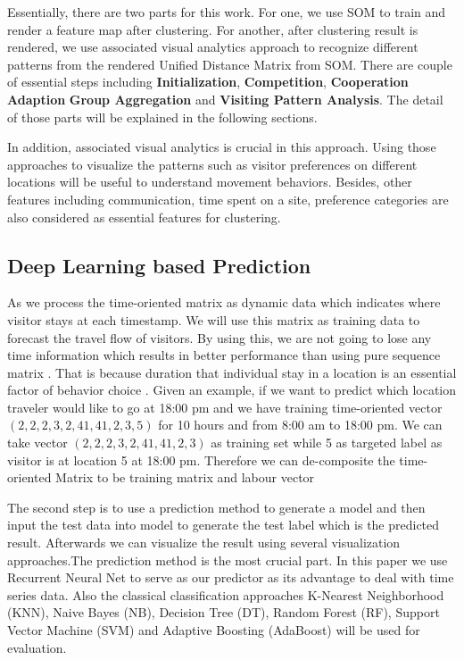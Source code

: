 \documentclass[runningheads,a4paper]{llncs}
\begin{document}
Essentially, there are two parts for this work. For one, we use SOM to train and render a feature map after clustering. For another, after clustering result is rendered, we use associated visual analytics approach to recognize different patterns from the rendered Unified Distance Matrix from SOM. There are couple of essential steps including \textbf{Initialization}, \textbf{Competition}, \textbf{Cooperation} \textbf{Adaption} \textbf{Group Aggregation} and \textbf{Visiting Pattern Analysis}. The detail of those parts will be explained in the following sections.

In addition, associated visual analytics is crucial in this approach. Using those approaches to visualize the patterns such as visitor preferences on different locations will be useful to understand movement behaviors. Besides, other features including communication, time spent on a site, preference categories are also considered as essential features for clustering.

\subsection{Deep Learning based Prediction}
As we process the time-oriented matrix as dynamic data which indicates where visitor stays at each timestamp. We will use this matrix as training data to forecast the travel flow of visitors. By using this, we are not going to lose any time information which results in better performance than using pure sequence matrix \cite{liu2016predicting}. That is because duration that individual stay in a location is an essential factor of behavior choice  \cite{zhang2016deep}.
Given an example, if we want to predict which location traveler would like to go at 18:00 pm and we have training time-oriented vector $ (2, 2, 2, 3, 2, 41, 41, 2, 3, 5)$ for 10 hours and from 8:00 am to 18:00 pm. We can take vector $ (2, 2, 2, 3, 2, 41, 41, 2, 3)$ as training set while 5 as targeted label as visitor is at location 5 at 18:00 pm. Therefore we can de-composite the time-oriented Matrix to be training matrix and labour vector

The second step is to use a prediction method to generate a model and then input the test data into model to generate the test label which is the predicted result. Afterwards we can visualize the result using several visualization approaches.The prediction method is the most crucial part. In this paper we use Recurrent Neural Net  \cite{lecun2015deep} to serve as our predictor as its advantage to deal with time series data. Also the classical classification approaches K-Nearest Neighborhood (KNN), Naive Bayes (NB), Decision Tree (DT), Random Forest (RF), Support Vector Machine (SVM) and Adaptive Boosting (AdaBoost) will be used for evaluation.
\end{document}
